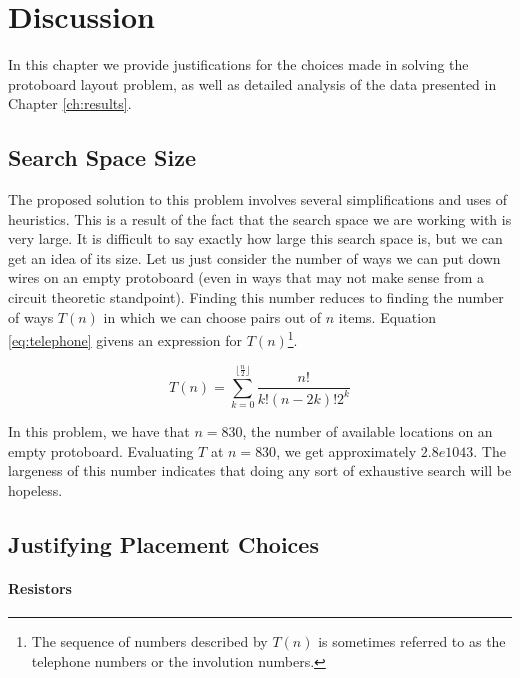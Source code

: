 
\chapter{Discussion}
\label{ch:discussion}

In this chapter we provide justifications for the choices made in solving the
protoboard layout problem, as well as detailed analysis of the data presented in
Chapter \ref{ch:results}.

\section{Search Space Size}
\label{sec:search_space_size}

The proposed solution to this problem involves several simplifications and uses
of heuristics. This is a result of the fact that the search space we are working
with is very large. It is difficult to say exactly how large this search space
is, but we can get an idea of its size. Let us just consider the number of ways
we can put down wires on an empty protoboard (even in ways that may not make
sense
from a circuit theoretic standpoint). Finding this number reduces to finding the
number of ways $T(n)$ in which we can choose pairs out of $n$ items. Equation
\ref{eq:telephone} givens an expression for $T(n)$\footnote{The sequence of
numbers described by $T(n)$ is sometimes referred to as the telephone numbers
or the involution numbers.}.

\begin{equation}
T(n) = \sum_{k = 0}^{\lfloor \frac{n}{2} \rfloor}{\frac{n!}{k! (n - 2k)! 2^k}}
\label{eq:telephone}
\end{equation}

In this problem, we have that $n = 830$, the number of available locations on an
empty protoboard. Evaluating $T$ at $n = 830$, we get approximately $2.8e1043$.
The largeness of this number indicates that doing any sort of exhaustive search
will be hopeless.

\section{Justifying Placement Choices}
\label{sec:justify_placement}

\subsubsection{Resistors}

